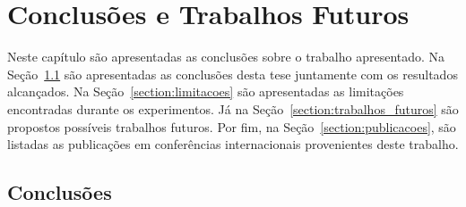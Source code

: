 \chapter{Conclusões e Trabalhos Futuros}\label{chapter:conclusoes_futuros}
Neste capítulo são apresentadas as conclusões sobre o trabalho apresentado. Na Seção~\ref{section:conclusoes} são apresentadas as conclusões desta tese juntamente com os resultados alcançados. Na Seção~\ref{section:limitacoes} são apresentadas as limitações encontradas durante os experimentos. Já na Seção~\ref{section:trabalhos_futuros} são propostos possíveis trabalhos futuros. Por fim, na Seção~\ref{section:publicacoes}, são listadas as publicações em conferências internacionais provenientes deste trabalho.




\section{Conclusões}\label{section:conclusoes}




